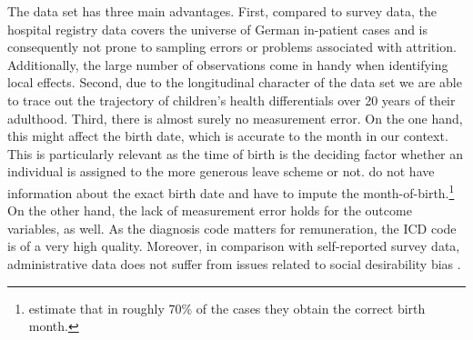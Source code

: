 \documentclass[11pt, a4paper,draft]{article} %
\begin{document}
 

The data set has three main advantages. First, compared to survey data, the hospital registry data covers the universe of German in-patient cases and is consequently not prone to sampling errors or problems associated with attrition. Additionally, the large number of observations come in handy when identifying local effects. Second, due to the longitudinal character of the data set we are able to trace out the trajectory of children's health differentials over 20 years of their adulthood. Third, there is almost surely no measurement error. On the one hand, this might affect the birth date, which is accurate to the month in our context. This is particularly relevant as the time of birth is the deciding factor whether an individual is assigned to the more generous leave scheme or not. \cite{Dustmann2012} do not have information about the exact birth date and have to impute the month-of-birth.\footnote{\cite{Dustmann2012} estimate that in roughly 70\% of the cases they obtain the correct birth month.} On the other hand, the lack of measurement error holds for the outcome variables, as well. As the diagnosis code matters for remuneration, the ICD code is of a very high quality. Moreover, in comparison with self-reported survey data, administrative data does not suffer from issues related to social desirability bias \citep{marcus2015}.\newline
\end{document}
